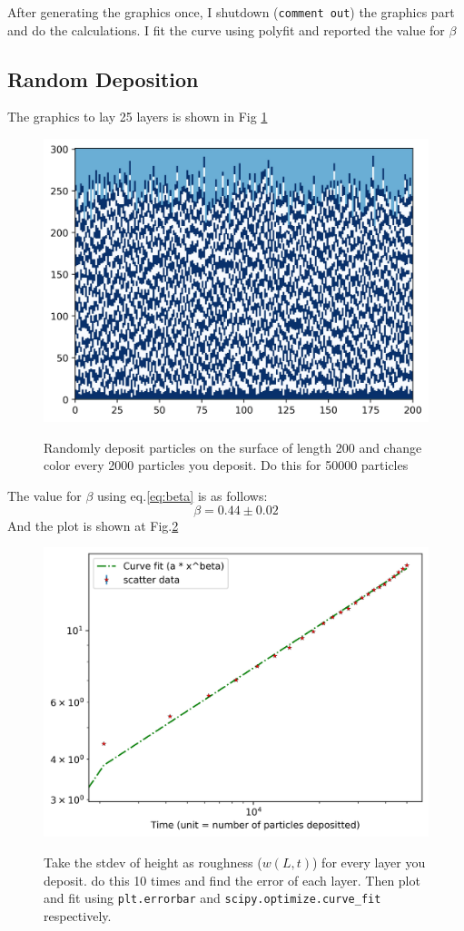 \documentclass[12pt]{article}
\begin{document}
	After generating the graphics once, I shutdown (\texttt{comment out}) the graphics part and do the calculations. I fit the curve using polyfit and reported the value for $\beta$
	\subsection{Random Deposition}
	The graphics to lay 25 layers is shown in Fig \ref{fig:RD25}
	\begin{figure}[h!]
		\centering
		\includegraphics[width=.9\linewidth]{../P4/canvas.jpg}
		\label{fig:RD25}
		\caption{Randomly deposit particles on the surface of length 200 and change  color every 2000 particles you deposit. Do this for 50000 particles}
	\end{figure}
	The value for $\beta$ using eq.\ref{eq:beta} is as follows:
	\begin{equation*}
		\beta = 0.44 \pm 0.02
	\end{equation*}
	And the plot is shown at Fig.\ref{fig:RD25beta}
	\begin{figure}[h!]
				\centering
		\includegraphics[width=.9\linewidth]{../P4/plot_for_beta.jpg}
		\label{fig:RD25beta}
		\caption{Take the stdev of height as roughness ($w(L, t)$) for every layer you deposit.
		do this 10 times and find the error of each layer. Then plot and fit using 
		\texttt{plt.errorbar} and \texttt{scipy.optimize.curve\_fit} respectively.}
	\end{figure}
\end{document}
